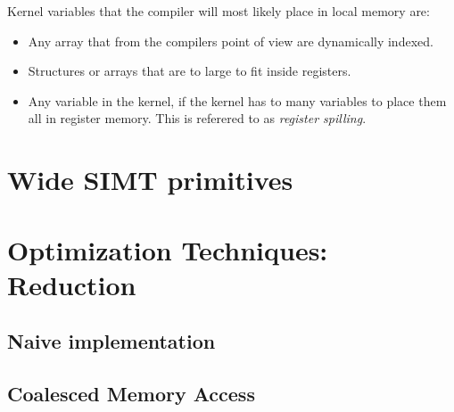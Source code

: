 Kernel variables that the compiler will most likely place in local memory are:

\begin{itemize}
  \item Any array that from the compilers point of view are dynamically indexed.
  \item Structures or arrays that are to large to fit inside registers.
  \item Any variable in the kernel, if the kernel has to many
    variables to place them all in register memory. This is referered
    to as \textit{register spilling}.
\end{itemize}





\section{Wide SIMT primitives}\label{sec:GPUprims}











\section{Optimization Techniques: Reduction}


\subsection{Naive implementation}


\subsection{Coalesced Memory Access}


